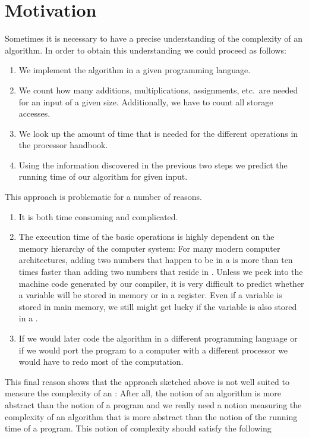 \section{Motivation}
Sometimes it is necessary to have a precise understanding of the complexity of an algorithm.  
In order to obtain this understanding we could proceed as follows:  
\begin{enumerate}
\item We implement the algorithm in a given programming language.
\item We count how many additions, multiplications, assignments, etc.~are needed
      for an input of a given size.  Additionally, we have to count all storage accesses.
\item We look up the amount of time that is needed for the different operations in the processor handbook.
\item Using the information discovered in the previous two steps we predict the running
      time of our algorithm for given input.
\end{enumerate}
This approach is problematic for a number of reasons.
\begin{enumerate}
\item It is both time consuming and complicated.
\item The execution time of the basic operations is highly dependent on the memory hierarchy of the
      computer system:  For many modern computer architectures, adding two numbers that happen to be
      in a  is more than ten times faster than adding two numbers that reside in
      .  Unless we peek into the machine code generated by our compiler, it is very difficult
      to predict whether a variable will be stored in memory or in a register.  Even if a variable
      is stored in main memory, we still might get lucky if the variable is also stored in a .
\item If we would later code the algorithm in a different programming language or if we would port
      the program to a computer with a different processor we would have to redo most of the
      computation. 
\end{enumerate}
This final reason shows that the approach sketched above is not well suited to measure the complexity of
an : After all, the notion of an algorithm is more abstract than the notion of a program
and we really need a notion measuring the complexity of an algorithm that is more abstract than the
notion of the running time of a program.  This notion of complexity should satisfy the following
